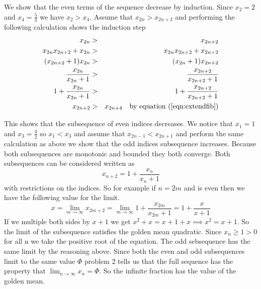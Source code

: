 \documentclass[11pt,reqno]{article}
\begin{document}
We show that the even terms of the sequence decrease by induction. Since $x_2 = 2$ and $x_4 = \frac{5}{3}$ we have $x_2 > x_4$. Assume that $x_{2n} > x_{2n+2}$ and performing the following calculation shows the induction step
\begin{eqnarray*}
x_{2n} &>& x_{2n+2} \\
x_{2n} x_{2n+2} + x_{2n} &>& x_{2n} x_{2n+2} + x_{2n+2} \\
(x_{2n+2} + 1)x_{2n} &>& (x_{2n} + 1) x_{2n+2} \\
\frac{x_{2n}}{x_{2n} + 1} &>& \frac{x_{2n+2}}{x_{2n + 2} + 1}\\
1 + \frac{x_{2n}}{x_{2n} + 1} &>& 1+ \frac{x_{2n+2}}{x_{2n + 2} + 1}\\
x_{2n+2} &>& x_{2n+4} \quad \text{by equation (\ref{eqn:extendfib})}
\end{eqnarray*}

This shows that the subsequence of even indices decreases. We notice that $x_1 = 1$ and $x_3 = \frac{3}{2}$ so $x_1 < x_3$ and assume that $x_{2n-1} < x_{2n+1}$ and perform the same calculation as above we show that the odd indices subsequence increases. Because both subsequences are monotonic and bounded they both converge. Both subsequences can be considered written as \[x_{n+2} = 1 + \frac{x_n}{x_n + 1}\] with restrictions on the indices. So for example if $n = 2m$ and is even then we have the following value for the limit.
\[ x = \lim_{m \to \infty} x_{2m + 2} = \lim_{m \to \infty}1 + \frac{x_{2m}}{x_{2m} + 1} = 1 + \frac{x}{x + 1} \]
If we multiple both sides by $x + 1$ we get $x^2 + x = x + 1 + x \implies x^2 = x + 1$. So the limit of the subsequence satisfies the golden mean quadratic. Since $x_n \ge 1 > 0$ for all n we take the positive root of the equation. The odd sebsequence has the same limit by the reasoning above. Since both the even and odd subsequences limit to the same value $\Phi$ problem 2 tells us that the full sequence has the property that $\lim_{n \to \infty} x_n = \Phi$. So the infinite fraction has the value of the golden mean.\\
\end{document}
